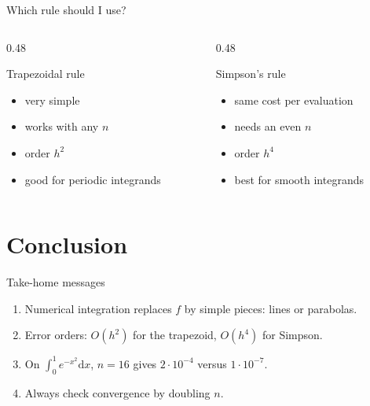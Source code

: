 \documentclass[aspectratio=169,11pt]{beamer}
\begin{document}
\begin{frame}{Which rule should I use?}
  \begin{columns}[T]
    \begin{column}{0.48\textwidth}
      \begin{block}{Trapezoidal rule}
        \begin{itemize}
          \item very simple
          \item works with any $n$
          \item order $h^{2}$
          \item good for \alert{periodic} integrands
        \end{itemize}
      \end{block}
    \end{column}
    \begin{column}{0.48\textwidth}
      \begin{exampleblock}{Simpson's rule}
        \begin{itemize}
          \item same cost per evaluation
          \item needs an even $n$
          \item order $h^{4}$
          \item best for \alert{smooth} integrands
        \end{itemize}
      \end{exampleblock}
    \end{column}
  \end{columns}
\end{frame}

\section{Conclusion}

\begin{frame}{Take-home messages}
  \large
  \begin{enumerate}
    \setlength\itemsep{0.9em}
    \item<1-> Numerical integration replaces $f$ by simple pieces: \alert{lines} or \alert{parabolas}.
    \item<2-> Error orders: $O(h^{2})$ for the trapezoid, $O(h^{4})$ for Simpson.
    \item<3-> On $\int_0^1 e^{-x^{2}}\mathrm{d}x$, $n=16$ gives \alert{$2\cdot10^{-4}$} versus \alert{$1\cdot10^{-7}$}.
    \item<4-> Always check convergence by doubling $n$.
  \end{enumerate}
\end{frame}
\end{document}
